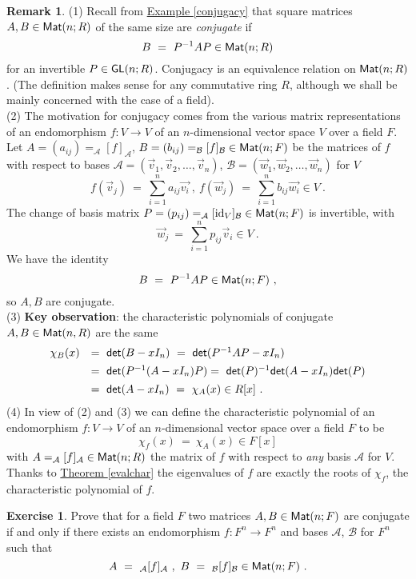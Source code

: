 \documentclass[11pt]{amsbook}
\DeclareMathOperator{\id}{\mathrm{id}}
\theoremstyle{definition}
\newtheorem{rem}[theorem]{Remark}
\newtheorem{exercise}{Exercise}
\begin{document}
\begin{rem}\label{charend}
(1)   Recall from  \hyperref[conjugacy]{Example \ref{conjugacy}} that square matrices $A,B \in {\sf Mat}(n;R)$ of the same size are {\it conjugate} if
$$B~=~P^{-1}AP \in {\sf Mat}(n;R)$$
for an invertible $P \in {\sf GL}(n;R)$. Conjugacy is an equivalence relation on ${\sf Mat}(n;R)$.
(The definition makes sense for any commutative ring $R$, although we shall be mainly concerned with the case of a field).\\ 
(2) The motivation for conjugacy comes from the various matrix representations of an endomorphism
$f:V \to V$ of an $n$-dimensional vector space $V$ over a field $F$. Let $A=(a_{ij})=_{\mathcal A}[f]_{\mathcal A}$, $B=(b_{ij})=_{\mathcal B}[f]_{\mathcal B} \in {\sf Mat}(n;F)$ be the matrices of $f$ with respect to bases ${\mathcal A}=(\vec{v}_1,\vec{v}_2,\dots,\vec{v}_n)$,
${\mathcal B}=(\vec{w}_1,\vec{w}_2,\dots,\vec{w}_n)$ for $V$
$$f(\vec{v}_j)~=~\sum\limits^n_{i=1}a_{ij}\vec{v_i}~,~f(\vec{w}_j)~=~
\sum\limits^n_{i=1}b_{ij}\vec{w_i} \in V~.$$
The change of basis matrix $P=(p_{ij})=_{\mathcal A}[\id_V]_{\mathcal B} \in {\sf Mat}(n;F)$ is invertible, with
$$\vec{w}_j~=~\sum\limits^n_{i=1}p_{ij}\vec{v}_i \in V~.$$
We have the identity
$$B~=~P^{-1}AP \in {\sf Mat}(n;F)~,$$
so $A,B$ are conjugate.\\
(3)  {\bf Key observation}: the characteristic polynomials of conjugate $A,B \in {\sf Mat}(n,R)$ are
the same
$$\begin{array}{ll}
\chi_B(x)&=~{\sf det}(B-xI_n)~=~{\sf det}(P^{-1}AP-xI_n)\\[1ex]
&=~{\sf det}(P^{-1}(A-xI_n)P)=~{\sf det}(P)^{-1}{\sf det}(A-xI_n){\sf det}(P)\\[1ex]
&=~{\sf det}(A-xI_n)~=~\chi_A(x) \in R[x]~.
\end{array}$$
(4) In view of (2) and (3) we can define the characteristic polynomial of an endomorphism
$f:V \to V$ of an $n$-dimensional vector space over a field $F$ to be
$$\chi_f(x)~=~\chi_A(x) \in F[x]$$
with $A=_{\mathcal A}[f]_{\mathcal A} \in {\sf Mat}(n;R)$ the matrix of $f$ with respect to
{\it any} basis ${\mathcal A}$ for $V$. Thanks to \hyperref[evalchar]{Theorem \ref{evalchar}} the eigenvalues of $f$ are exactly the roots of $\chi_f$, the characteristic polynomial of $f$.
\end{rem}

\begin{exercise} Prove that for a field $F$  two matrices $A,B \in {\sf Mat}(n;F)$ are conjugate if and only
if there exists an endomorphism $f:F^n \to F^n$ and bases  ${\mathcal A}$, ${\mathcal B}$ for $F^n$ such that
$$A~=~_{\mathcal A}[f]_{\mathcal A}~,~B~=~_{\mathcal B}[f]_{\mathcal B} \in {\sf Mat}(n;F)~.$$
\end{exercise}
\end{document}
